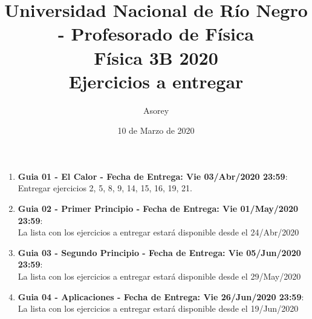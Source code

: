 \documentclass[a4paper,12pt]{article}
\begin{document}
\title{
{\normalsize{Universidad Nacional de Río Negro - Profesorado de Física}}\\
Física 3B 2020\\ Ejercicios a entregar}
\author{Asorey}
\date{10 de Marzo de 2020}
\maketitle

\begin{enumerate}
	\item {\bf{Guia 01 - El Calor - Fecha de Entrega: Vie 03/Abr/2020 23:59}}:\\
		Entregar ejercicios 2, 5, 8, 9, 14, 15, 16, 19, 21.
	\item {\bf{Guia 02 - Primer Principio - Fecha de Entrega: Vie 01/May/2020 23:59}}:\\		
		La lista con los ejercicios a entregar estará disponible desde el 24/Abr/2020
	\item {\bf{Guia 03 - Segundo Principio - Fecha de Entrega: Vie 05/Jun/2020 23:59}}:\\		
		La lista con los ejercicios a entregar estará disponible desde el 29/May/2020
	\item {\bf{Guia 04 - Aplicaciones - Fecha de Entrega: Vie 26/Jun/2020 23:59}}:\\		
		La lista con los ejercicios a entregar estará disponible desde el 19/Jun/2020
\end{enumerate}
\end{document}
